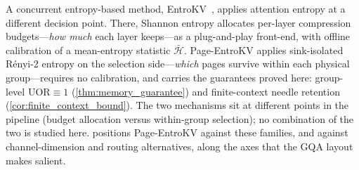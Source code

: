 \documentclass[final,5p,times,twocolumn]{elsarticle}
\theoremstyle{definition}
\theoremstyle{remark}
\newcommand{\method}{Page-EntroKV}
\newcommand{\UOR}{\mathrm{UOR}}
\begin{document}
A concurrent entropy-based method, EntroKV~\cite{entrokv2025}, applies
attention entropy at a different decision point. There, Shannon entropy
allocates per-layer compression budgets---\emph{how much} each layer
keeps---as a plug-and-play front-end, with offline calibration of a
mean-entropy statistic $\bar{\mathcal{H}}$. \method{} applies
sink-isolated R\'enyi-2 entropy on the selection side---\emph{which}
pages survive within each physical group---requires no calibration, and
carries the guarantees proved here: group-level $\UOR\equiv 1$ (\cref{thm:memory_guarantee}) and finite-context needle retention
(\cref{cor:finite_context_bound}). The two mechanisms sit at different
points in the pipeline (budget allocation versus within-group
selection); no combination of the two is studied here.
 positions \method{} against these families, and
against channel-dimension and routing alternatives, along the axes that
the GQA layout makes salient.
\end{document}
